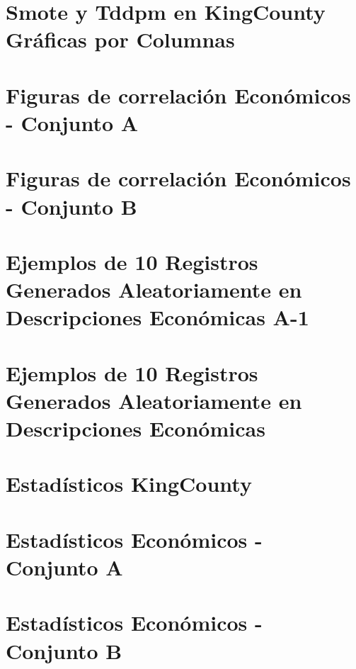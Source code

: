 \section{Smote y Tddpm en KingCounty Gráficas por Columnas}



\section{Figuras de correlación Económicos - Conjunto A}
\label{pairwise-full-a}



\section{Figuras de correlación Económicos - Conjunto B}
\label{pairwise-full-a}


\section{Ejemplos de 10 Registros Generados Aleatoriamente en Descripciones Económicas A-1}
\label{ejemplo-10-aleatoreos-a}


\section{Ejemplos de 10 Registros Generados Aleatoriamente en Descripciones Económicas}
\label{ejemplo-10-aleatoreos-b}


\section{Estadísticos KingCounty}
\label{propiedades-estadisticas-kingCounty}


\section{Estadísticos Económicos - Conjunto A}
\label{propiedades-estadisticas-economicos-A}



\section{Estadísticos Económicos - Conjunto B}
\label{propiedades-estadisticas-economicos-B}



